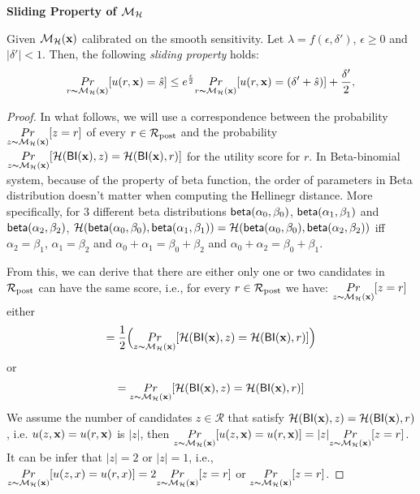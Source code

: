 \documentclass{article}
\begin{document}
\noindent \textbf{Sliding Property of $\mathcal{M}_{\mathcal{H}}$}
\begin{lem}
Given $\mathcal{M}_{\mathcal{H}}(\textbf{x})$ calibrated on the smooth sensitivity. Let $\lambda = f(\epsilon,
\delta')$, $\epsilon\geq 0$ and $|\delta'| < 1$. Then, the following \emph{sliding property} holds:
\begin{equation*}
\underset{r \thicksim \mathcal{M}_{\mathcal{H}}(\textbf{x})}{Pr}[u(r,\textbf{x}) = \hat{s}]
\leq
e^{\frac{\epsilon}{2}} \underset{r \thicksim \mathcal{M}_{\mathcal{H}}(\textbf{x})}{Pr}[u(r,\textbf{x}) = (\delta' + \hat{s})] + \frac{\delta'}{2},
\end{equation*}

\end{lem}

\begin{proof}

In what follows, we will use a correspondence between the probability
 $\underset{z \thicksim \mathcal{M}_{\mathcal{H}}(\textbf{x})}{Pr}[z = r]$ of every
 $r\in\mathcal{R}_{\textup{post}}$ and the probability 
 $\underset{z \thicksim \mathcal{M}_{\mathcal{H}}(\textbf{x})}{Pr}[\mathcal{H}(\mathsf{BI}(\textbf{x}),z) =
 \mathcal{H}(\mathsf{BI}(\textbf{x}),r)]$ for the utility score for $r$. In Beta-binomial system, because of the property of beta function, the order of parameters in Beta distribution doesn't matter when computing the Hellinegr distance. More specifically, for 3 different beta distributions $\mathsf{beta}(\alpha_0, \beta_0)$, $\mathsf{beta}(\alpha_1, \beta_1)$ and $\mathsf{beta}(\alpha_2, \beta_2)$, $\mathcal{H}(\mathsf{beta}(\alpha_0, \beta_0),\mathsf{beta}(\alpha_1, \beta_1)) = \mathcal{H}(\mathsf{beta}(\alpha_0, \beta_0),\mathsf{beta}(\alpha_2, \beta_2))$ iff $\alpha_2 = \beta_1$,  $\alpha_1 = \beta_2$ and $\alpha_0 + \alpha_1 = \beta_0 + \beta_2$ and $\alpha_0 + \alpha_2 = \beta_0 + \beta_1$.

 From this, we can derive that there are either only one or two candidates in $\mathcal{R}_{\textup{post}}$ can have the same score, i.e., for every $r \in \mathcal{R}_{\textup{post}}$ we have: $
 \underset{z \thicksim \mathcal{M}_{\mathcal{H}}(\textbf{x})}{Pr}[z = r]$ either 
 $$
 =\frac{1}{2}\Big (\underset{z \thicksim \mathcal{M}_{\mathcal{H}}(\textbf{x})}{Pr}[\mathcal{H}(\mathsf{BI}(\textbf{x}),z) =
 \mathcal{H}(\mathsf{BI}(\textbf{x}),r)]\Big )
 $$ or 
 $$
 =\underset{z \thicksim \mathcal{M}_{\mathcal{H}}(\textbf{x})}{Pr}[\mathcal{H}(\mathsf{BI}(\textbf{x}),z) = \mathcal{H}(\mathsf{BI}(\textbf{x}),r)]
 $$
 We assume the number of candidates $z \in \mathcal{R}$ that satisfy $\mathcal{H}(\mathsf{BI}(\textbf{x}),z) = \mathcal{H}(\mathsf{BI}(\textbf{x}),r)$, i.e. $u(z,\textbf{x}) = u(r,\textbf{x})$ is $|z|$, then  $\underset{z \thicksim \mathcal{M}_{\mathcal{H}}(\textbf{x})}{Pr}[u(z,\textbf{x}) = u(r,\textbf{x})] = |z| \underset{z \thicksim \mathcal{M}_{\mathcal{H}}(\textbf{x})}{Pr}[z = r]$. It can be infer that $|z| = 2$ or $|z| = 1$, i.e., $\underset{z \thicksim \mathcal{M}_{\mathcal{H}}(\textbf{x})}{Pr}[u(z,x) = u(r,x)] = 2 \underset{z \thicksim \mathcal{M}_{\mathcal{H}}(\textbf{x})}{Pr}[z = r]$ or $\underset{z \thicksim \mathcal{M}_{\mathcal{H}}(\textbf{x})}{Pr}[z = r]$.


\end{proof}
\end{document}
